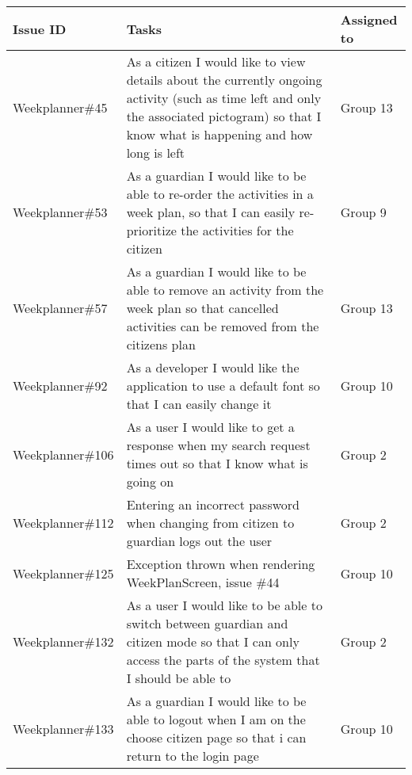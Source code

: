 \begin{longtable}{|p{2.9cm}|p{8cm}|p{2cm}|}
    \hline
    Issue ID        & Tasks                                                                                                                                                                             & Assigned to      \\ \hline
    Weekplanner\#45 & As a citizen I would like to view details about the currently ongoing activity (such as time left and only the associated pictogram) so that I know what is happening and how long is left & Group 13            \\ \hline
    Weekplanner\#53 & As a guardian I would like to be able to re-order the activities in a week plan, so that I can easily re-prioritize the activities for the citizen                                      & Group 9           \\ \hline
    Weekplanner\#57 & As a guardian I would like to be able to remove an activity from the week plan so that cancelled activities can be removed from the citizens plan                                    & Group 13           \\ \hline
    Weekplanner\#92 & As a developer I would like the application to use a default font so that I can easily change it                                                                                       & Group 10           \\ \hline
    Weekplanner\#106 & As a user I would like to get a response when my search request times out so that I know what is going on                                                                             & Group 2           \\ \hline
    Weekplanner\#112 & Entering an incorrect password when changing from citizen to guardian logs out the user                                                                                                  & Group 2          \\ \hline
    Weekplanner\#125 & Exception thrown when rendering WeekPlanScreen, issue \#44                                                                                                                             & Group 10           \\ \hline
    Weekplanner\#132 & As a user I would like to be able to switch between guardian and citizen mode so that I can only access the parts of the system that I should be able to                            & Group 2           \\ \hline
    Weekplanner\#133 & As a guardian I would like to be able to logout when I am on the choose citizen page so that i can return to the login page                                                              & Group 10           \\ \hline

\end{longtable}
